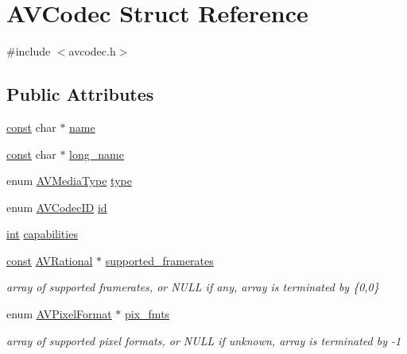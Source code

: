 \hypertarget{struct_a_v_codec}{}\section{A\+V\+Codec Struct Reference}
\label{struct_a_v_codec}


{\ttfamily \#include $<$avcodec.\+h$>$}

\subsection*{Public Attributes}
\begin{DoxyCompactItemize}
\item 
\hyperlink{getopt1_8c_a2c212835823e3c54a8ab6d95c652660e}{const} char $\ast$ \hyperlink{struct_a_v_codec_ad3daa3e729850b573c139a83be8938ca}{name}
\item 
\hyperlink{getopt1_8c_a2c212835823e3c54a8ab6d95c652660e}{const} char $\ast$ \hyperlink{struct_a_v_codec_acb4afcfce3b6541ed70aa7f21d507422}{long\+\_\+name}
\item 
enum \hyperlink{group__lavu__misc_ga9a84bba4713dfced21a1a56163be1f48}{A\+V\+Media\+Type} \hyperlink{struct_a_v_codec_ab539ca86026d043803c24ba06fa84197}{type}
\item 
enum \hyperlink{group__lavc__core_gaadca229ad2c20e060a14fec08a5cc7ce}{A\+V\+Codec\+ID} \hyperlink{struct_a_v_codec_a01a53d07936f4c7ee280444793b6967b}{id}
\item 
\hyperlink{xmltok_8h_a5a0d4a5641ce434f1d23533f2b2e6653}{int} \hyperlink{struct_a_v_codec_af51f7ff3dac8b730f46b9713e49a2518}{capabilities}
\item 
\hyperlink{getopt1_8c_a2c212835823e3c54a8ab6d95c652660e}{const} \hyperlink{struct_a_v_rational}{A\+V\+Rational} $\ast$ \hyperlink{struct_a_v_codec_a5cc75a0ab41697df21a8cd649662190c}{supported\+\_\+framerates}
\begin{DoxyCompactList}\small\item\em array of supported framerates, or N\+U\+LL if any, array is terminated by \{0,0\} \end{DoxyCompactList}\item 
enum \hyperlink{pixfmt_8h_a9a8e335cf3be472042bc9f0cf80cd4c5}{A\+V\+Pixel\+Format} $\ast$ \hyperlink{struct_a_v_codec_ac2b97bd3c19686025e1b7d577329c250}{pix\+\_\+fmts}
\begin{DoxyCompactList}\small\item\em array of supported pixel formats, or N\+U\+LL if unknown, array is terminated by -\/1 \end{DoxyCompactList}\item 

\end{DoxyCompactItemize}
